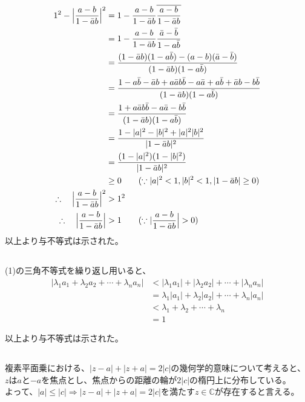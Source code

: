 \documentclass[dvipdfmx,a4paper]{jsarticle}
\begin{document}
\subsection{}
\begin{align*}
1^2 - \Bigl|\frac{a-b}{1-\bar a b}\Bigr|^2 &= 1 - \frac{a-b}{1-\bar a b}\overline{\frac{a - b}{1 - \bar a b}}\\
&= 1 - \frac{a-b}{1 - \bar a b}\frac{\bar a - \bar b}{1 - a \bar b}\\
&= \frac{(1 - \bar a b)(1 - a \bar b) - (a-b)(\bar a - \bar b)}{(1 - \bar a b)(1 - a \bar b)}\\
&= \frac{1 - a \bar b - \bar a b + a \bar a b \bar b - a \bar a + a \bar b + \bar a b - b \bar b}{(1 - \bar a b)(1 - a \bar b)}\\
&= \frac{1 + a \bar a b \bar b - a \bar a - b \bar b}{(1 - \bar a b)(1 - a \bar b)}\\
&= \frac{1 - |a|^2 - |b|^2 + |a|^2|b|^2}{|1 - \bar a b|^2}\\
&= \frac{(1 - |a|^2)(1 - |b|^2)}{|1 - \bar a b|^2}\\
&\geq 0 \qquad(\because |a|^2<1, |b|^2<1, |1 - \bar a b| \geq 0)\\
\therefore \quad \Bigl|\frac{a-b}{1-\bar a b}\Bigr|^2 &> 1^2\\
\therefore \quad \Bigl|\frac{a-b}{1-\bar a b}\Bigr| &> 1\qquad(\because|\frac{a-b}{1-\bar a b}\Bigr|>0)
\end{align*}
以上より与不等式は示された。\\


\subsection{}
(1)の三角不等式を繰り返し用いると、
\begin{align*}
|\lambda_1a_1 +\lambda_2a_2 + \cdots +\lambda_na_n| &< |\lambda_1a_1| + |\lambda_2a_2| + \cdots + |\lambda_na_n|\\
&= \lambda_1|a_1| + \lambda_2|a_2| + \cdots + \lambda_n|a_n|\\
&< \lambda_1 + \lambda_2 + \cdots + \lambda_n\\
&= 1
\end{align*}

以上より与不等式は示された。\\

\subsection{}
複素平面乗における、$|z-a| + |z+a| = 2|c|$の幾何学的意味について考えると、\\
$z$は$a$と$-a$を焦点とし、焦点からの距離の輪が$2|c|$の楕円上に分布している。\\
よって、$|a| \leq|c|\Rightarrow$$|z-a| + |z+a| = 2|c|$を満たす$z\in \mathbb{C}$が存在すると言える。\\
\end{document}
